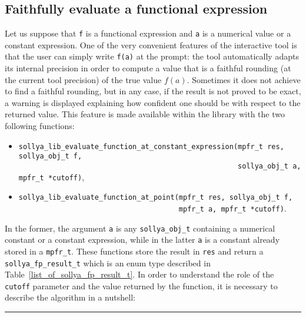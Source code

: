 \documentclass[a4paper]{article}
\begin{document}
\subsection{Faithfully evaluate a functional expression}
Let us suppose that \verb|f| is a functional expression and \verb|a| is a numerical value or a constant expression. One of the very convenient features of the interactive tool is that the user can simply write \verb|f(a)| at the prompt: the tool automatically adapts its internal precision in order to compute a value that is a faithful rounding (at the current tool precision) of the true value $f(a)$. Sometimes it does not achieve to find a faithful rounding, but in any case, if the result is not proved to be exact, a warning is displayed explaining how confident one should be with respect to the returned value. This feature is made available within the library with the two following functions:
\begin{itemize}
\item \verb|sollya_lib_evaluate_function_at_constant_expression(mpfr_t res, sollya_obj_t f,|\\
      \verb|                                                    sollya_obj_t a, mpfr_t *cutoff)|,
\item \verb|sollya_lib_evaluate_function_at_point(mpfr_t res, sollya_obj_t f,|\\
      \verb|                                      mpfr_t a, mpfr_t *cutoff)|.
\end{itemize}
In the former, the argument \verb|a| is any \verb|sollya_obj_t| containing a numerical constant or a constant expression, while in the latter \verb|a| is a constant already stored in a \verb|mpfr_t|. These functions store the result in \verb|res| and return a \verb|sollya_fp_result_t| which is an enum type described in Table~\ref{list_of_sollya_fp_result_t}. In order to understand the role of the \verb|cutoff| parameter and the value returned by the function, it is necessary to describe the algorithm in a nutshell:\\
\rule{\textwidth}{0.5px}
\end{document}
